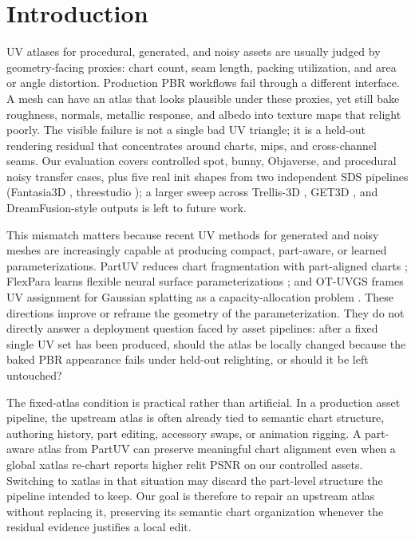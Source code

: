 \section{Introduction}
\label{sec:introduction}

UV atlases for procedural, generated, and noisy assets are usually judged by geometry-facing proxies: chart count, seam length, packing utilization, and area or angle distortion. Production PBR workflows fail through a different interface. A mesh can have an atlas that looks plausible under these proxies, yet still bake roughness, normals, metallic response, and albedo into texture maps that relight poorly. The visible failure is not a single bad UV triangle; it is a held-out rendering residual that concentrates around charts, mips, and cross-channel seams. Our evaluation covers controlled spot, bunny, Objaverse, and procedural noisy transfer cases, plus five real init shapes from two independent SDS pipelines (Fantasia3D \cite{chen2023fantasia3d}, threestudio \cite{guo2023threestudio}); a larger sweep across Trellis-3D \cite{xiang2024_trellis_structured_3d_latents}, GET3D \cite{gao2022_get3d_generative_model}, and DreamFusion-style outputs \cite{poole2023_dreamfusion_text_to_3d} is left to future work.

This mismatch matters because recent UV methods for generated and noisy meshes are increasingly capable at producing compact, part-aware, or learned parameterizations. PartUV reduces chart fragmentation with part-aligned charts \cite{wang2025_partuv_part_based_uv}; FlexPara learns flexible neural surface parameterizations \cite{zhao2025_flexpara_flexible_neural_surface}; and OT-UVGS frames UV assignment for Gaussian splatting as a capacity-allocation problem \cite{kim2026_ot_uvgs_revisiting_uv}. These directions improve or reframe the geometry of the parameterization. They do not directly answer a deployment question faced by asset pipelines: after a fixed single UV set has been produced, should the atlas be locally changed because the baked PBR appearance fails under held-out relighting, or should it be left untouched?

The fixed-atlas condition is practical rather than artificial. In a production asset pipeline, the upstream atlas is often already tied to semantic chart structure, authoring history, part editing, accessory swaps, or animation rigging. A part-aware atlas from PartUV can preserve meaningful chart alignment even when a global xatlas re-chart reports higher relit PSNR on our controlled assets. Switching to xatlas in that situation may discard the part-level structure the pipeline intended to keep. Our goal is therefore to repair an upstream atlas without replacing it, preserving its semantic chart organization whenever the residual evidence justifies a local edit.

